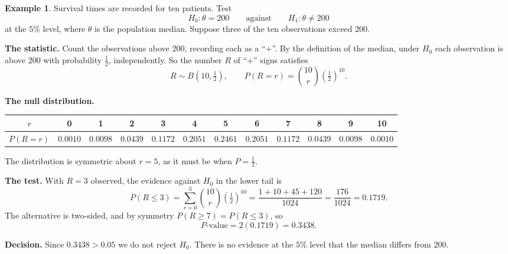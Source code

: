 \documentclass[11pt,a4paper]{article}
\theoremstyle{definition}
\newtheorem{example}[thm]{Example}
\begin{document}
\begin{example}
Survival times are recorded for ten patients. Test
$$H_0 : \theta = 200 \qquad\text{against}\qquad H_1 : \theta \neq 200$$
at the $5\%$ level, where $\theta$ is the population median. Suppose three of the
ten observations exceed $200$.

\textbf{The statistic.} Count the observations above $200$, recording each as a
``$+$''. By the definition of the median, under $H_0$ each observation is above
$200$ with probability $\tfrac12$, independently. So the number $R$ of ``$+$''
signs satisfies
$$R \sim B\!\left(10, \tfrac12\right),
\qquad
P(R = r) = \binom{10}{r}\left(\tfrac12\right)^{10}.$$

\textbf{The null distribution.}
\begin{center}
\begin{tabular}{c|ccccccccccc}
$r$ & 0 & 1 & 2 & 3 & 4 & 5 & 6 & 7 & 8 & 9 & 10\\
\hline
$P(R=r)$ & $0.0010$ & $0.0098$ & $0.0439$ & $0.1172$ & $0.2051$ & $0.2461$
& $0.2051$ & $0.1172$ & $0.0439$ & $0.0098$ & $0.0010$\\
\end{tabular}
\end{center}
The distribution is symmetric about $r = 5$, as it must be when $P = \tfrac12$.

\textbf{The test.} With $R = 3$ observed, the evidence against $H_0$ in the lower
tail is
$$P(R \leq 3) = \sum^{3}_{r=0}\binom{10}{r}\left(\tfrac12\right)^{10}
= \dfrac{1+10+45+120}{1024} = \dfrac{176}{1024} = 0.1719 .$$
The alternative is two-sided, and by symmetry $P(R \geq 7) = P(R \leq 3)$, so
$$P\text{-value} = 2(0.1719) = 0.3438 .$$

\textbf{Decision.} Since $0.3438 > 0.05$ we do not reject $H_0$. There is no
evidence at the $5\%$ level that the median differs from $200$.
\end{example}
\end{document}
